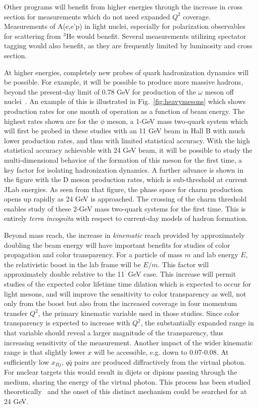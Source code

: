 Other programs will benefit from higher energies through the increase in cross section for measurements which do not need expanded $Q^2$ coverage. Measurements of  A(e,e'p) in light nuclei, especially for polarization observables for scattering from $^3$He would benefit. Several measurements utilizing spectator tagging would also benefit, as they are frequently limited by luminosity and cross section.

At higher energies, completely new probes of quark hadronization dynamics will be possible. For example, it will be possible to produce more massive hadrons, beyond the present-day limit of 0.78 GeV for production of the $\omega$ meson off nuclei~\cite{borquez_2021}. An example of this is illustrated in Fig.~\ref{fig:heavymesons} which shows production rates for one month of operation as a function of beam energy. The highest rates shown are for the $\phi$ meson, a 1-GeV mass two-quark system which will first be probed in these studies with an 11 GeV beam in Hall B with much lower production rates, and thus with limited statistical accuracy. With the high statistical accuracy achievable with 24 GeV beam, it will be possible to study the multi-dimensional behavior of the formation of this meson for the first time, a key factor for isolating hadronization dynamics. A further advance is shown in the figure with the D meson production rates, which is sub-threshold at current JLab energies. As seen from that figure, the phase space for charm production opens up rapidly as 24 GeV is approached. The crossing of the charm threshold enables study of these 2-GeV mass two-quark systems for the first time. This is entirely {\em{terra incognita}} with respect to current-day models of hadron formation.   

Beyond mass reach, the increase in {\em{kinematic}} reach provided by approximately doubling the beam energy will have important benefits for studies of color propagation and color transparency. For a particle of mass $m$ and lab energy $E$, the relativistic boost in the lab frame will be $E/m$. This factor will approximately double relative to the 11~GeV case. This increase will permit studies of the expected color lifetime time dilation which is expected to occur for light mesons, and will improve the sensitivity to color transparency as well, not only from the boost but also from the increased coverage in four momentum transfer $Q^2$, the primary kinematic variable used in those studies. Since color transparency is expected to increase with $Q^2$, the substantially expanded range in that variable should reveal a larger magnitude of the transparency, thus increasing sensitivity of the measurement.
Another impact of the wider kinematic range is that slightly lower $x$ will be accessible, e.g. down to 0.07-0.08. At sufficiently low $x_{Bj}$, $q\bar{q}$ pairs are produced diffractively from the virtual photon. For nuclear targets this would result in dijets or dipions passing through the medium, sharing the energy of the virtual photon. This process has been studied theoretically~\cite{PhysRevD.46.931} and the onset of this distinct mechanism could be searched for at 24 GeV.

